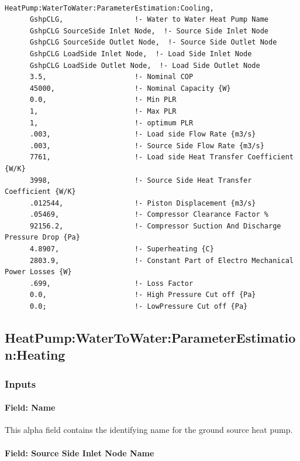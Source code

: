 \begin{lstlisting}

HeatPump:WaterToWater:ParameterEstimation:Cooling,
      GshpCLG,                 !- Water to Water Heat Pump Name
      GshpCLG SourceSide Inlet Node,  !- Source Side Inlet Node
      GshpCLG SourceSide Outlet Node,  !- Source Side Outlet Node
      GshpCLG LoadSide Inlet Node,  !- Load Side Inlet Node
      GshpCLG LoadSide Outlet Node,  !- Load Side Outlet Node
      3.5,                     !- Nominal COP
      45000,                   !- Nominal Capacity {W}
      0.0,                     !- Min PLR
      1,                       !- Max PLR
      1,                       !- optimum PLR
      .003,                    !- Load side Flow Rate {m3/s}
      .003,                    !- Source Side Flow Rate {m3/s}
      7761,                    !- Load side Heat Transfer Coefficient {W/K}
      3998,                    !- Source Side Heat Transfer Coefficient {W/K}
      .012544,                 !- Piston Displacement {m3/s}
      .05469,                  !- Compressor Clearance Factor %
      92156.2,                 !- Compressor Suction And Discharge Pressure Drop {Pa}
      4.8907,                  !- Superheating {C}
      2803.9,                  !- Constant Part of Electro Mechanical Power Losses {W}
      .699,                    !- Loss Factor
      0.0,                     !- High Pressure Cut off {Pa}
      0.0;                     !- LowPressure Cut off {Pa}
\end{lstlisting}

\subsection{HeatPump:WaterToWater:ParameterEstimation:Heating}\label{heatpumpwatertowaterparameterestimationheating}

\subsubsection{Inputs}\label{inputs-15-010}

\paragraph{Field: Name}\label{field-name-14-006}

This alpha field contains the identifying name for the ground source heat pump.

\paragraph{Field: Source Side Inlet Node Name}\label{field-source-side-inlet-node-name-3}

